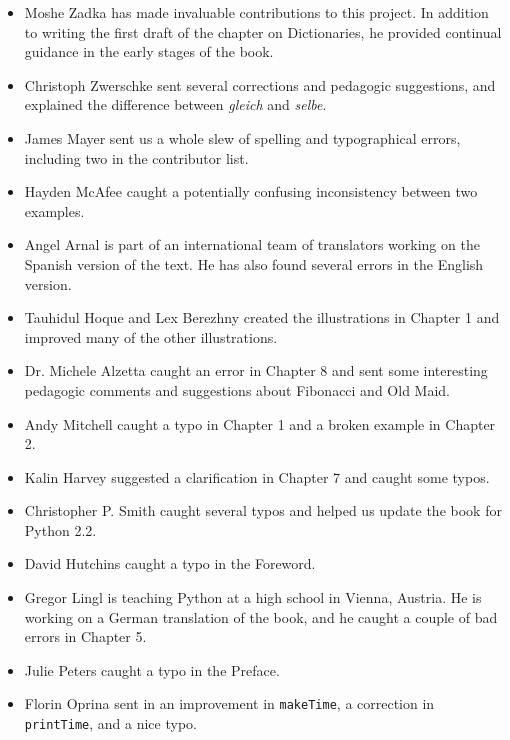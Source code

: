 \documentclass[10pt]{book}
\begin{document}
\begin{itemize}
\item Moshe Zadka has made invaluable contributions to this project.
In addition to writing the first draft of the chapter on Dictionaries, he
provided continual guidance in the early stages of the book.

\item Christoph Zwerschke sent several corrections and
pedagogic suggestions, and explained the difference between {\em gleich}
and {\em selbe}.

\item James Mayer sent us a whole slew of spelling and
typographical errors, including two in the contributor list.

\item Hayden McAfee caught a potentially confusing inconsistency
between two examples.

\item Angel Arnal is part of an international team of translators
working on the Spanish version of the text.  He has also found several
errors in the English version.

\item Tauhidul Hoque and Lex Berezhny created the illustrations
in Chapter 1 and improved many of the other illustrations.

\item Dr. Michele Alzetta caught an error in Chapter 8 and sent
some interesting pedagogic comments and suggestions about Fibonacci
and Old Maid.

\item Andy Mitchell caught a typo in Chapter 1 and a broken example
in Chapter 2.

\item Kalin Harvey suggested a clarification in Chapter 7 and
caught some typos.

\item Christopher P. Smith caught several typos and helped us
update the book for Python 2.2.

\item David Hutchins caught a typo in the Foreword.

\item Gregor Lingl is teaching Python at a high school in Vienna,
Austria.  He is working on a German translation of the book,
and he caught a couple of bad errors in Chapter 5.

\item Julie Peters caught a typo in the Preface.

\item Florin Oprina sent in an improvement in {\tt makeTime},
a correction in {\tt printTime}, and a nice typo.


\end{itemize}
\end{document}
